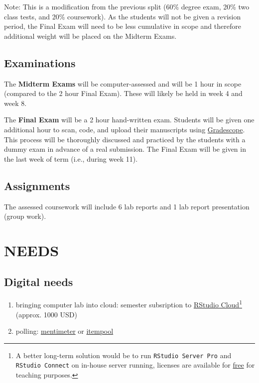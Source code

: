 \documentclass[
]{book}
\providecommand{\tightlist}{%
  \setlength{\itemsep}{0pt}\setlength{\parskip}{0pt}}
\begin{document}
Note: This is a modification from the previous split (60\% degree exam, 20\% two
class tests, and 20\% coursework). As the students will not be given a revision period, the Final Exam will need to be less cumulative in scope and therefore additional weight will be placed on the Midterm Exams.

\hypertarget{examinations}{%
\section{Examinations}\label{examinations}}

The \textbf{Midterm Exams} will be computer-assessed and will be 1 hour in scope (compared to the 2 hour Final Exam). These will likely be held in week 4 and week 8.

The \textbf{Final Exam} will be a 2 hour hand-written exam. Students will be given one additional hour to scan, code, and upload their manuscripts using \href{https://www.gradescope.com/}{Gradescope}. This process will be thoroughly discussed and practiced by the students with a dummy exam in advance of a real submission. The Final Exam will be given in the last week of term (i.e., during week 11).

\hypertarget{assignments}{%
\section{Assignments}\label{assignments}}

The assessed coursework will include 6 lab reports and 1 lab report presentation (group work).

\hypertarget{needs}{%
\chapter{NEEDS}\label{needs}}

\hypertarget{digital-needs}{%
\section*{Digital needs}\label{digital-needs}}

\begin{enumerate}
\def\labelenumi{\arabic{enumi}.}
\tightlist
\item
  bringing computer lab into cloud: semester subsription to \href{https://rstudio.cloud/}{RStudio Cloud}\footnote{A better long-term solution would be to run \texttt{RStudio\ Server\ Pro} and \texttt{RStudio\ Connect} on in-house server running, licenses are available for \href{https://rstudio.com/pricing/academic-pricing/}{free} for teaching purposes.} (approx. 1000 USD)
\item
  polling: \href{https://www.mentimeter.com/}{mentimeter} or \href{https://itempool.com/}{itempool}
\end{enumerate}
\end{document}
